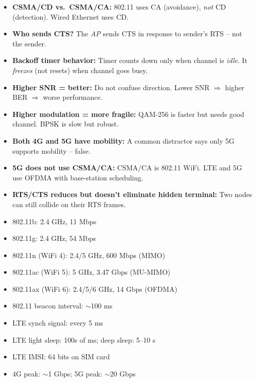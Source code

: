 \begin{warnbox}
\begin{itemize}[noitemsep]
    \item \textbf{CSMA/CD vs.\ CSMA/CA:} 802.11 uses CA (avoidance), \emph{not} CD (detection). Wired Ethernet uses CD.
    \item \textbf{Who sends CTS?} The \emph{AP} sends CTS in response to sender's RTS -- not the sender.
    \item \textbf{Backoff timer behavior:} Timer counts down only when channel is \emph{idle}. It \emph{freezes} (not resets) when channel goes busy.
    \item \textbf{Higher SNR = better:} Do not confuse direction. Lower SNR $\Rightarrow$ higher BER $\Rightarrow$ worse performance.
    \item \textbf{Higher modulation = more fragile:} QAM-256 is faster but needs good channel. BPSK is slow but robust.
    \item \textbf{Both 4G and 5G have mobility:} A common distractor says only 5G supports mobility -- false.
    \item \textbf{5G does not use CSMA/CA:} CSMA/CA is 802.11 WiFi. LTE and 5G use OFDMA with base-station scheduling.
    \item \textbf{RTS/CTS reduces but doesn't eliminate hidden terminal:} Two nodes can still collide on their RTS frames.
\end{itemize}
\end{warnbox}

\begin{formulabox}
\begin{itemize}[noitemsep]
    \item 802.11b: 2.4 GHz, 11 Mbps
    \item 802.11g: 2.4 GHz, 54 Mbps
    \item 802.11n (WiFi 4): 2.4/5 GHz, 600 Mbps (MIMO)
    \item 802.11ac (WiFi 5): 5 GHz, 3.47 Gbps (MU-MIMO)
    \item 802.11ax (WiFi 6): 2.4/5/6 GHz, 14 Gbps (OFDMA)
    \item 802.11 beacon interval: $\sim$100 ms
    \item LTE synch signal: every 5 ms
    \item LTE light sleep: 100s of ms; deep sleep: 5--10 s
    \item LTE IMSI: 64 bits on SIM card
    \item 4G peak: $\sim$1 Gbps; 5G peak: $\sim$20 Gbps
\end{itemize}
\end{formulabox}
